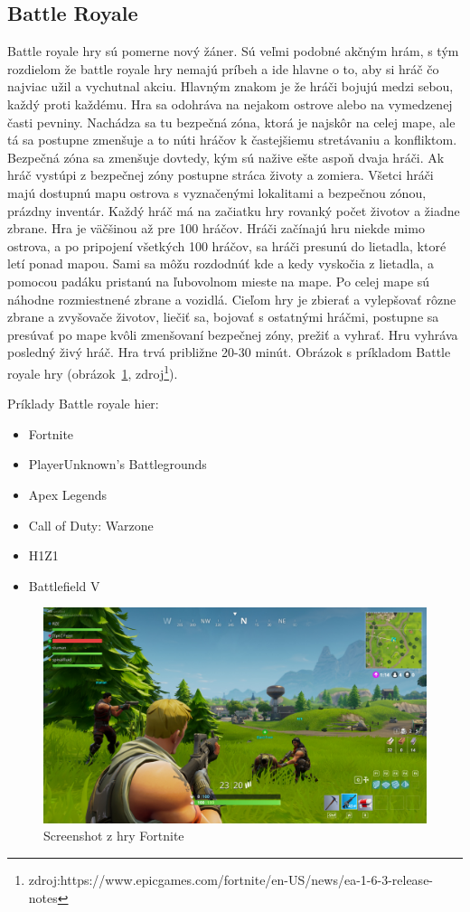 \documentclass[10pt,oneside,slovak,a4paper]{article}
\begin{document}
\subsection{Battle Royale} \label{zanre:battleroyale}

Battle royale hry sú pomerne nový žáner. Sú veľmi podobné akčným hrám, s tým rozdielom že battle royale hry nemajú príbeh a ide hlavne o to, aby si hráč čo najviac užil a vychutnal akciu. Hlavným znakom je že hráči bojujú medzi sebou, každý proti každému. Hra sa odohráva na nejakom ostrove alebo na vymedzenej časti pevniny. Nachádza sa tu bezpečná zóna, ktorá je najskôr na celej mape, ale tá sa postupne zmenšuje a to núti hráčov k častejšiemu stretávaniu a konfliktom. Bezpečná zóna sa zmenšuje dovtedy, kým sú nažive ešte aspoň dvaja hráči. Ak hráč vystúpi z bezpečnej zóny postupne stráca životy a zomiera. Všetci hráči majú dostupnú mapu ostrova s vyznačenými lokalitami a bezpečnou zónou, prázdny inventár. Každý hráč má na začiatku hry rovanký počet životov a žiadne zbrane. Hra je väčšinou až pre 100 hráčov. Hráči začínajú hru niekde mimo ostrova, a po pripojení všetkých 100 hráčov, sa hráči presunú do lietadla, ktoré letí ponad mapou. Sami sa môžu rozdodnúť kde a kedy vyskočia z lietadla, a pomocou padáku pristanú na ľubovolnom mieste na mape. Po celej mape sú náhodne rozmiestnené zbrane a vozidlá. Cieľom hry je zbierať a vylepšovať rôzne zbrane a zvyšovače životov, liečiť sa, bojovať s ostatnými hráčmi, postupne sa presúvať po mape kvôli zmenšovaní bezpečnej zóny, prežiť a vyhrať. Hru vyhráva posledný živý hráč. Hra trvá približne 20-30 minút. Obrázok s príkladom Battle royale hry (obrázok~\ref{f:fortnite}, zdroj\footnote{zdroj:https://www.epicgames.com/fortnite/en-US/news/ea-1-6-3-release-notes}).

Príklady Battle royale hier:
\begin{itemize}
\item Fortnite
\item PlayerUnknown's Battlegrounds
\item Apex Legends
\item Call of Duty: Warzone
\item H1Z1
\item Battlefield V
\end{itemize}

\begin{figure}[tbh]
\centering
\includegraphics[scale=0.15]{fortnite.jpg}
\caption{Screenshot z hry Fortnite}
\label{f:fortnite}
\end{figure}
\end{document}
